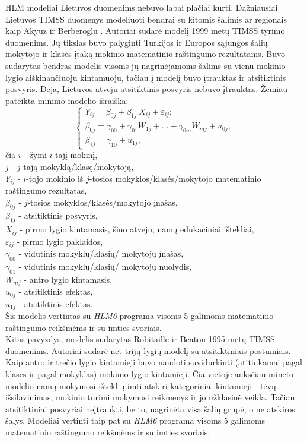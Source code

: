 \documentclass[11pt,a4paper]{article}
\begin{document}
\indent HLM modeliai Lietuvos duomenims nebuvo labai plačiai kurti. Dažniausiai Lietuvos TIMSS duomenys modeliuoti bendrai su kitomis šalimis ar regionais kaip Akyuz ir Berberoglu \cite{2007All}. Autoriai sudarė modelį 1999 metų TIMSS tyrimo duomenims. Jų tikslas buvo palyginti Turkijos ir Europos sąjungos šalių mokytojo ir klasės įtaką mokinio matematinio raštingumo rezultatams. Buvo sudarytas bendras modelis visoms jų nagrinėjamoms šalims su vienu mokinio lygio aiškinančiuoju kintamuoju, tačiau į modelį buvo įtrauktas ir atsitiktinis posvyris. Deja, Lietuvos atveju atsitiktinis posvyris nebuvo įtrauktas. Žemiau pateikta minimo modelio išraiška:
\[ \left\{
\begin{array}{l}
Y_{ij} = \beta_{0j}+\beta_{1j}\ X_{ij}+\varepsilon_{ij}; \\
\beta_{0j} = \gamma_{00} + \gamma_{01} W_{1j}+\dots+\gamma_{0m} W_{mj}+u_{0j};\\
\beta_{1j} = \gamma_{10} + u_{1j},
\end{array} \right.
\]
čia $i$ - žymi $i$-tajį mokinį,\\
$j$ - $j$-tają mokyklą/klasę/mokytoją,\\
$Y_{ij}$ - $i$-tojo mokinio iš $j$-tosios mokyklos/klasės/mokytojo matematinio raštingumo rezultatas,\\
$\beta_{0j}$ - $j$-tosios mokyklos/klasės/mokytojo įnašas,\\
$\beta_{1j}$ - atsitiktinis posvyris,\\
$X_{ij}$ - pirmo lygio kintamasis, šiuo atveju, namų edukaciniai ištekliai, \\
$\varepsilon_{ij}$ - pirmo lygio paklaidos,\\
$\gamma_{00}$ - vidutinis mokyklų/klasių/ mokytojų įnašas,\\
$\gamma_{01}$ - vidutinis mokyklų/klasių/ mokytojų nuolydis,\\
$W_{mj}$ - antro lygio kintamasis, \\
$u_{0j}$ - atsitiktinis efektas,\\
$u_{1j}$ - atsitiktinis efektas.\\
Šis modelis vertintas su \textit{HLM6} programa visoms 5 galimoms matematinio raštingumo reikšmėms ir su imties svoriais.\\
\indent Kitas pavyzdys, modelis sudarytas Robitaille ir Beaton \cite{timssLiet} 1995 metų TIMSS duomenims. Autoriai sudarė net trijų lygių modelį su atsitiktiniais postūmiais. Kaip antro ir trečio lygio kintamieji buvo naudoti suvidurkinti (atitinkamai pagal klases ir pagal mokyklas) mokinio lygio kintamieji. Čia vietoje anksčiau minėto modelio namų mokymosi išteklių imti atskiri kategoriniai kintamieji - tėvų išsilavinimas, mokinio turimi mokymosi reikmenys ir jo užklasinė veikla. Tačiau atsitiktiniai posvyriai neįtraukti, be to, nagrinėta visa šalių grupė, o ne atskiros šalys. Modeliai vertinti taip pat su \textit{HLM6} programa visoms 5 galimoms matematinio raštingumo reikšmėms ir su imties svoriais.
\end{document}
